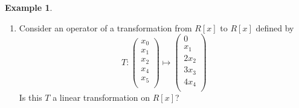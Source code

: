 \documentclass[11pt,a4paper]{article}
\theoremstyle{definition}
\newtheorem{exa}[thm]{Example}
\begin{document}
\begin{exa}
\begin{enumerate}
\begin{enumerate}
\item[(ii)] For a scalar $\lambda$, $\, T\begin{pmatrix}
\lambda \begin{pmatrix}
x\\
y\\
z\\
\end{pmatrix}
\end{pmatrix} = T\begin{pmatrix}
\lambda\, x\\
\lambda\, y\\
\lambda\, z\\
\end{pmatrix} = \begin{pmatrix}
\lambda\, x\\
\lambda\, y\\
-\lambda\, z\\
\end{pmatrix} = \lambda\begin{pmatrix}
x\\
y\\
-z\\
\end{pmatrix} = \lambda\, T\begin{pmatrix}
x\\
y\\
z\\
\end{pmatrix}$\\\\
\end{enumerate}



\item Consider an operator of a transformation from $R[x]$ to $R[x]$ defined by $$T : \begin{pmatrix}
x_0\\
x_1\\
x_2\\
x_4\\
x_5\\
\end{pmatrix} \longmapsto \begin{pmatrix}
0\\
x_1\\
2 x_2\\
3x_3\\
4 x_4\\
\end{pmatrix}$$
Is this $T$ a linear transformation on $R[x]$?\\


\end{enumerate}
\end{exa}
\end{document}
